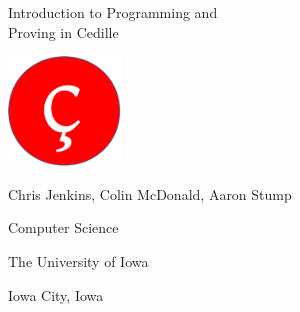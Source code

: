 \documentclass[11pt]{beamer}
\date{\ }
\begin{document}

\begin{frame}

\begin{center}
{\Large
  Introduction to Programming and \\
  Proving in Cedille }

\vspace{.2cm}

\includegraphics[width=3cm]{logo}


\vspace{.6cm}

Chris Jenkins, Colin McDonald, Aaron Stump

{\small
Computer Science 

The University of Iowa

Iowa City, Iowa}

\end{center}
\end{frame}

\newcommand{\grun}[1]{\textcolor{dgreen}{\underline{#1}}}
\end{document}
